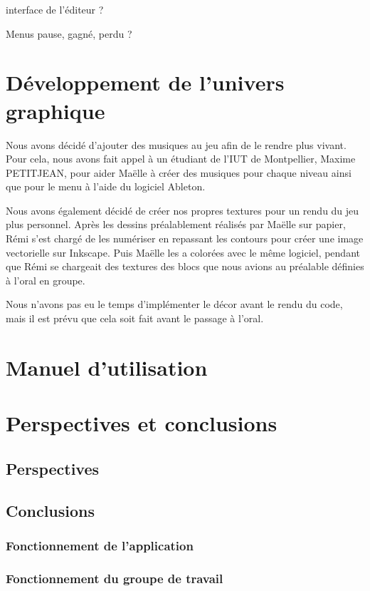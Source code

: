 \documentclass[12pt]{report}
\begin{document}
		
		interface de l'éditeur ?
		
		
		Menus pause, gagné, perdu ?
		
	\chapter{Développement de l'univers graphique}
		Nous avons décidé d'ajouter des musiques au jeu afin de le rendre plus vivant. Pour cela, nous avons fait appel à un étudiant de l'IUT de Montpellier, Maxime PETITJEAN, pour aider Maëlle à créer des musiques pour chaque niveau ainsi que pour le menu à l'aide du logiciel Ableton.
		
		
		Nous avons également décidé de créer nos propres textures pour un rendu du jeu plus personnel. Après les dessins préalablement réalisés par Maëlle sur papier, Rémi s'est chargé de les numériser en repassant les contours pour créer une image vectorielle sur Inkscape. Puis Maëlle les a colorées avec le même logiciel, pendant que Rémi se chargeait des textures des blocs que nous avions au préalable définies à l'oral en groupe. 
		
		
		Nous n'avons pas eu le temps d'implémenter le décor avant le rendu du code, mais il est prévu que cela soit fait avant le passage à l'oral. 

	\chapter{Manuel d'utilisation}
	\chapter{Perspectives et conclusions}
		\section{Perspectives}
		\section{Conclusions}
			\subsection{Fonctionnement de l'application}
			\subsection{Fonctionnement du groupe de travail}
	
\end{document}
